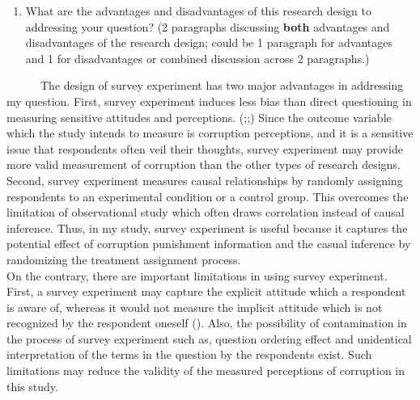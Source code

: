\documentclass[
  11pt,
]{article}
\providecommand{\tightlist}{%
  \setlength{\itemsep}{0pt}\setlength{\parskip}{0pt}}
\begin{document}
\begin{enumerate}
\def\labelenumi{\arabic{enumi}.}
\setcounter{enumi}{3}
\tightlist
\item
  What are the advantages and disadvantages of this research design to
  addressing your question? (2 paragraphs discussing \textbf{both}
  advantages and disadvantages of the research design; could be 1
  paragraph for advantages and 1 for disadvantages or combined
  discussion across 2 paragraphs.)
\end{enumerate}

~~~~~~The design of survey experiment has two major advantages in
addressing my question. First, survey experiment induces less bias than
direct questioning in measuring sensitive attitudes and perceptions.
(\textcite{blair_design_2015};\textcite{rosenfeld_empirical_2016};\textcite{lensvelt-mulders_meta-analysis_2005})
Since the outcome variable which the study intends to measure is
corruption perceptions, and it is a sensitive issue that respondents
often veil their thoughts, survey experiment may provide more valid
measurement of corruption than the other types of research designs.
Second, survey experiment measures causal relationships by randomly
assigning respondents to an experimental condition or a control group.
This overcomes the limitation of observational study which often draws
correlation instead of causal inference. Thus, in my study, survey
experiment is useful because it captures the potential effect of
corruption punishment information and the casual inference by
randomizing the treatment assignment process.\\
\hspace*{0.333em}\hspace*{0.333em}\hspace*{0.333em}\hspace*{0.333em}\hspace*{0.333em}\hspace*{0.333em}On
the contrary, there are important limitations in using survey
experiment. First, a survey experiment may capture the explicit attitude
which a respondent is aware of, whereas it would not measure the
implicit attitude which is not recognized by the respondent oneself
(\textcite{nosek_implicitexplicit_2007}). Also, the possibility of
contamination in the process of survey experiment such as, question
ordering effect and unidentical interpretation of the terms in the
question by the respondents exist. Such limitations may reduce the
validity of the measured perceptions of corruption in this study.
\end{document}
